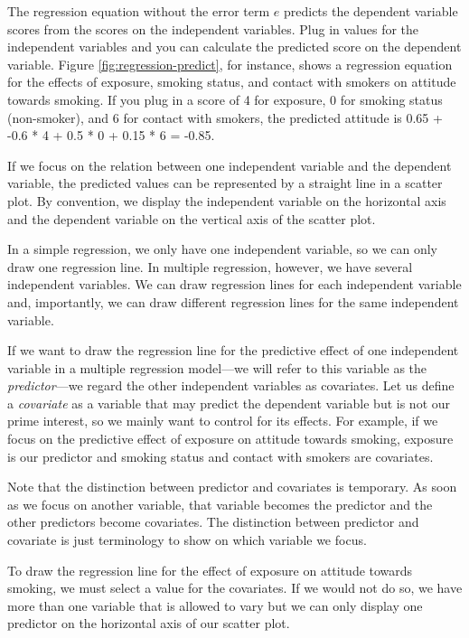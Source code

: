 \documentclass[a4paper]{book}
\theoremstyle{definition}
\theoremstyle{definition}
\theoremstyle{definition}
\theoremstyle{remark}
\begin{document}
The regression equation without the error term \(e\) predicts the
dependent variable scores from the scores on the independent variables.
Plug in values for the independent variables and you can calculate the
predicted score on the dependent variable. Figure
\ref{fig:regression-predict}, for instance, shows a regression equation
for the effects of exposure, smoking status, and contact with smokers on
attitude towards smoking. If you plug in a score of 4 for exposure, 0
for smoking status (non-smoker), and 6 for contact with smokers, the
predicted attitude is 0.65 + -0.6 * 4 + 0.5 * 0 + 0.15 * 6 = -0.85.

If we focus on the relation between one independent variable and the
dependent variable, the predicted values can be represented by a
straight line in a scatter plot. By convention, we display the
independent variable on the horizontal axis and the dependent variable
on the vertical axis of the scatter plot.

In a simple regression, we only have one independent variable, so we can
only draw one regression line. In multiple regression, however, we have
several independent variables. We can draw regression lines for each
independent variable and, importantly, we can draw different regression
lines for the same independent variable.

If we want to draw the regression line for the predictive effect of one
independent variable in a multiple regression model---we will refer to
this variable as the \emph{predictor}---we regard the other independent
variables as covariates. Let us define a \emph{covariate} as a variable
that may predict the dependent variable but is not our prime interest,
so we mainly want to control for its effects. For example, if we focus
on the predictive effect of exposure on attitude towards smoking,
exposure is our predictor and smoking status and contact with smokers
are covariates.

Note that the distinction between predictor and covariates is temporary.
As soon as we focus on another variable, that variable becomes the
predictor and the other predictors become covariates. The distinction
between predictor and covariate is just terminology to show on which
variable we focus.

To draw the regression line for the effect of exposure on attitude
towards smoking, we must select a value for the covariates. If we would
not do so, we have more than one variable that is allowed to vary but we
can only display one predictor on the horizontal axis of our scatter
plot.
\end{document}
